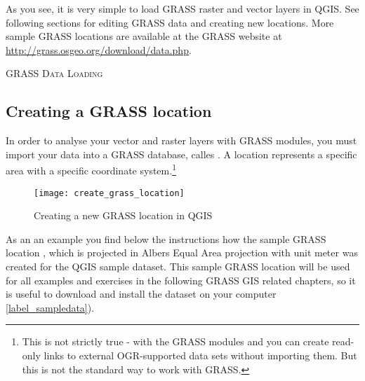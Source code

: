 As you see, it is very simple to load GRASS raster and vector layers in QGIS. 
See following sections for editing GRASS data and creating new locations.
More sample GRASS locations are available at the GRASS website at
\url{http://grass.osgeo.org/download/data.php}.

\begin{Tip}\caption{\textsc{GRASS Data Loading}}
\end{Tip} 

\subsection{Creating a GRASS location}\label{sec:create_loc}

In order to analyse your vector and raster layers with GRASS modules, you
must import your data into a GRASS database, calles . A
location represents a specific area with a specific coordinate
system.\footnote{This is not strictly true - with the GRASS modules
 and  you can create read-only
links to external OGR-supported data sets without importing them. But this is
not the standard way to work with GRASS.}

\begin{figure}[ht]
\begin{center}
\caption{Creating a new GRASS location in QGIS \nixcaption}\label{fig:grass_location}\smallskip
\texttt{[image: create\_grass\_location]}
\end{center}  
\end{figure}

As an an example you find below the instructions how the sample GRASS
location , which is projected in Albers Equal Area
projection with unit meter was created for the QGIS sample dataset. This
sample GRASS location  will be used for all examples and
exercises in the following GRASS GIS related chapters, so it is useful to
download and install the dataset on your computer \ref{label_sampledata}).

